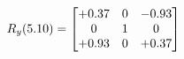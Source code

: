 \documentclass[preview]{standalone}
\begin{document}
\begin{align*}
\special{dvisvgm:raw <g id='unique000'>}R_{y}(5.10) = \begin{bmatrix}+0.37 & 0 & -0.93 \\0 & 1 & 0 \\+0.93 & 0 & +0.37\end{bmatrix}\special{dvisvgm:raw </g>}
\end{align*}
\end{document}
